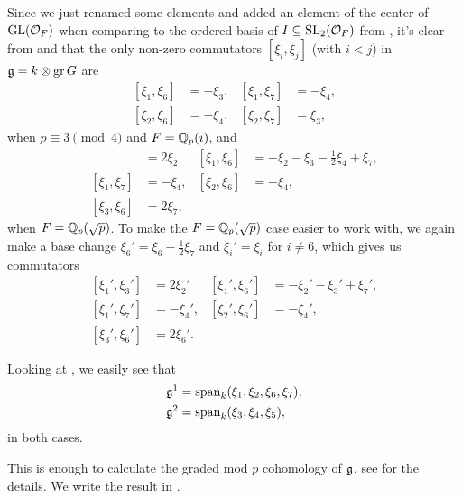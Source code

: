 Since we just renamed some elements and added an element of the center of $\operatorname{GL}(\mathcal{O}_{F})$ when comparing to the ordered basis of $I \subseteq \operatorname{SL}_{2}(\mathcal{O}_{F})$ from , it's clear from  and  that the only non-zero commutators $[\xi_{i},\xi_{j}]$  (with $i<j$) in  $\mathfrak{g} = k \otimes \operatorname{gr} G$ are
\begin{equation}
  \label{eq:xi_ij-GL2-F-unram}
  \begin{aligned}
    [\xi_{1},\xi_{6}] &= -\xi_{3}, & [\xi_{1},\xi_{7}] &= -\xi_{4}, \\
    [\xi_{2},\xi_{6}] &= -\xi_{4}, & [\xi_{2},\xi_{7}] &= \xi_{3},
  \end{aligned}
\end{equation}
when $p\equiv3 \pmod{4}$ and $F = \mathbb{Q}_{p}(i)$, and
\begin{align*}
  [\xi_{1},\xi_{3}] &= 2\xi_{2} & [\xi_{1},\xi_{6}] &= -\xi_{2} - \xi_{3} - \frac{1}{2}\xi_{4} + \xi_{7}, \\
  [\xi_{1},\xi_{7}] &= -\xi_{4}, & [\xi_{2},\xi_{6}] &= -\xi_{4}, \\
  [\xi_{3},\xi_{6}] &= 2\xi_{7},
\end{align*}
when $F = \mathbb{Q}_{p}(\sqrt{p})$. To make the $F = \mathbb{Q}_{p}(\sqrt{p})$ case easier to work with, we again make a base change $\xi_{6}' = \xi_{6} - \frac{1}{2}\xi_{7}$ and $\xi_{i}' = \xi_{i}$ for $i \neq 6$, which gives us commutators
\begin{equation}
  \label{eq:xi_ij-GL2-F-ram}
  \begin{aligned}
    [\xi_{1}',\xi_{3}'] &= 2\xi_{2}' & [\xi_{1}',\xi_{6}'] &= -\xi_{2}' - \xi_{3}' + \xi_{7}', \\
    [\xi_{1}',\xi_{7}'] &= -\xi_{4}', & [\xi_{2}',\xi_{6}'] &= -\xi_{4}', \\
    [\xi_{3}',\xi_{6}'] &= 2\xi_{6}'.
  \end{aligned}
\end{equation}

Looking at , we easily see that
\begin{align*}
  \mathfrak{g}^{1} &= \operatorname{span}_{k}(\xi_{1},\xi_{2},\xi_{6},\xi_{7}), \\
  \mathfrak{g}^{2} &= \operatorname{span}_{k}(\xi_{3},\xi_{4},\xi_{5}),
\end{align*}
in both cases.

This is enough to calculate the graded mod $p$ cohomology of $\mathfrak{g}$, see \cite{code} for the details. We write the result in .


